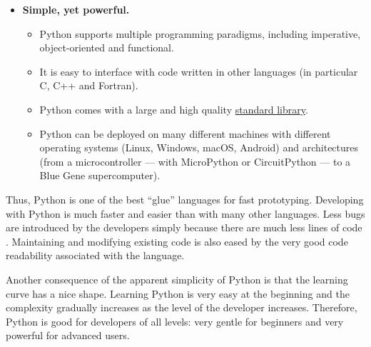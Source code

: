 \begin{itemize}
\item \textbf{Simple, yet powerful.}

\begin{itemize}
\item Python supports multiple programming paradigms, including imperative,
object-oriented and functional.

\item It is easy to interface with code written in other languages (in particular
C, C++ and Fortran).

\item Python comes with a large and high quality \href{https://docs.python.org%
/3/library/index.html}{standard library}.

\item Python can be deployed on many different machines with different operating
systems (Linux, Windows, macOS, Android) and architectures (from a microcontroller
--- with MicroPython or CircuitPython --- to a Blue Gene supercomputer).

\end{itemize}
\end{itemize}

Thus, Python is one of the best ``glue'' languages for fast prototyping.
Developing with Python is much faster and easier than with many other
languages.  Less bugs are introduced by the developers simply because there are
much less lines of code \cite{nanz_comparative_2015}.
%
Maintaining and modifying existing code is also eased by the very good code
readability associated with the language.

Another consequence of the apparent simplicity of Python is that the learning
curve has a nice shape. Learning Python is very easy at the beginning and the
complexity gradually increases as the level of the developer increases.
%
Therefore, Python is good for developers of all levels: very gentle for
beginners and very powerful for advanced users.

